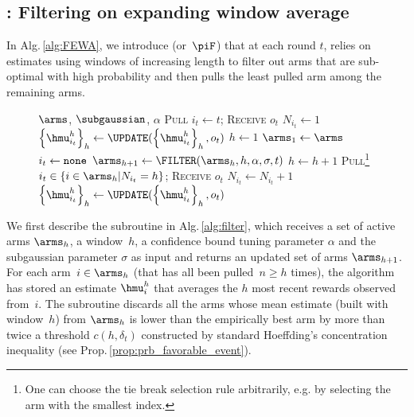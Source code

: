 \subsection{{\FEWA}: Filtering on expanding window average}
\label{ss:fewa}
In Alg.\,\ref{alg:FEWA}, we introduce \FEWA (or~$\piF$) that at each round $t$, relies on estimates using windows of increasing length to filter out arms that are sub-optimal with high probability and then pulls the least pulled arm among the remaining arms. 
 \begin{figure}[!ht]
 \begin{minipage}{\textwidth}
\renewcommand*\footnoterule{}
\begin{savenotes}
\begin{algorithm}[H]
\caption{{\FEWA}}
\label{alg:FEWA}
\begin{algorithmic}[1]
\Require $\arms$,  $\subgaussian$, $\alpha$
	\State \textsc{Pull}  $i_t \gets t$; \textsc{Receive} $o_{t}$
	\State $N_{i_t} \gets 1$
	\State $\left\{\hmu_{i_t}^h\right\}_h \gets \UPDATE(\left\{\hmu_{i_t}^h\right\}_h, o_t)$\label{algline:fewa-update1}
\EndFor
{}
	\State $h\leftarrow 1$ 
	{\footnotesize {}}
	\State $\arms_1 \leftarrow \arms$ 
	{\footnotesize {}}
	\State $i_t \gets {\tt none}$
	 \label{algline:fewa-while}
		\State $\arms_{h+1} \leftarrow {\FILTER}(\arms_{h} ,h, \alpha, \sigma, t)$ \label{algline:fewa-filter}
		\State $h \leftarrow h + 1$ \label{algline:fewa-window}
			\label{algline:fewa-condition}
			\State \textsc{Pull}\footnote{One can choose the tie break selection rule arbitrarily, e.g. by selecting the arm with the smallest index.}  $i_t \in \left\{ i \in \arms_h | N_{i_t} = h \right\}$; \textsc{Receive} $o_{t}$\label{algline:fewa-pull}
		\EndIf
	\EndWhile
    \State $N_{i_t} \leftarrow N_{i_t} +1$
	\State $\left\{\hmu_{i_t}^h\right\}_h \gets \UPDATE(\left\{\hmu_{i_t}^h\right\}_h, o_t)$\label{algline:fewa-update2}
\EndFor
\end{algorithmic}
\end{algorithm}
\end{savenotes}
\end{minipage}
\end{figure}

We first describe the subroutine {\FILTER} in Alg.\,\ref{alg:filter}, which receives a set of active arms $\arms_h$, a window~$h$, a confidence bound tuning parameter $\alpha$ and the subgaussian parameter $\sigma$  as input and returns an updated set of arms $\arms_{h+1}$. For each arm~$i \in \arms_h$ (that has all been pulled~$n \geq h$ times), the algorithm has stored an estimate $\hmu_i^h$ that averages the $h$ most recent rewards observed from~$i$. 
The subroutine \FILTER discards all the arms whose mean estimate (built with window~$h$) from $\arms_h$  is lower than the empirically best arm by more than twice a threshold $c(h, \delta_t)$ constructed by standard Hoeffding's concentration inequality (see Prop.\,\ref{prop:prb_favorable_event}).



